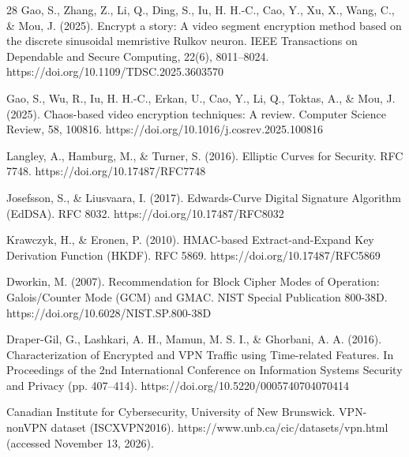 \documentclass[preprint,12pt]{elsarticle}
\theoremstyle{plain}
\begin{document}
\begin{thebibliography}{28}
Gao, S., Zhang, Z., Li, Q., Ding, S., Iu, H. H.-C., Cao, Y., Xu, X., Wang, C., \& Mou, J. (2025). Encrypt a story: A video segment encryption method based on the discrete sinusoidal memristive Rulkov neuron. IEEE Transactions on Dependable and Secure Computing, 22(6), 8011--8024. https://doi.org/10.1109/TDSC.2025.3603570

Gao, S., Wu, R., Iu, H. H.-C., Erkan, U., Cao, Y., Li, Q., Toktas, A., \& Mou, J. (2025). Chaos-based video encryption techniques: A review. Computer Science Review, 58, 100816. https://doi.org/10.1016/j.cosrev.2025.100816

Langley, A., Hamburg, M., \& Turner, S. (2016). Elliptic Curves for Security. RFC 7748. https://doi.org/10.17487/RFC7748

Josefsson, S., \& Liusvaara, I. (2017). Edwards-Curve Digital Signature Algorithm (EdDSA). RFC 8032. https://doi.org/10.17487/RFC8032

Krawczyk, H., \& Eronen, P. (2010). HMAC-based Extract-and-Expand Key Derivation Function (HKDF). RFC 5869. https://doi.org/10.17487/RFC5869

Dworkin, M. (2007). Recommendation for Block Cipher Modes of Operation: Galois/Counter Mode (GCM) and GMAC. NIST Special Publication 800-38D. https://doi.org/10.6028/NIST.SP.800-38D

Draper-Gil, G., Lashkari, A. H., Mamun, M. S. I., \& Ghorbani, A. A. (2016). Characterization of Encrypted and VPN Traffic using Time-related Features. In Proceedings of the 2nd International Conference on Information Systems Security and Privacy (pp. 407--414). https://doi.org/10.5220/0005740704070414

Canadian Institute for Cybersecurity, University of New Brunswick. VPN-nonVPN dataset (ISCXVPN2016). https://www.unb.ca/cic/datasets/vpn.html (accessed November 13, 2026).

\end{thebibliography}
\end{document}
